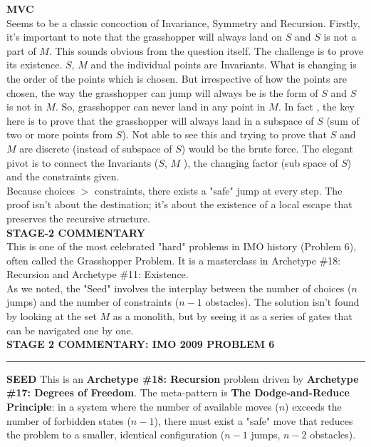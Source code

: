 \documentclass{article}
\begin{document}
\noindent \textbf{MVC} \\
Seems to be a classic concoction of Invariance, Symmetry and Recursion. Firstly, it's important to note that the grasshopper will always land on $S$ and $S$ is not a part of $M$. This sounds obvious from the question itself. The challenge is to prove its existence. $S$, $M$ and the individual points are Invariants. What is changing is the order of the points which is chosen. But irrespective of how the points are chosen, the way the grasshopper can jump will always be is the form of $S$ and $S$ is not in $M$. So, grasshopper can never land in any point in $M$. In fact , the key here is to prove that the grasshopper will always land in a subspace of $S$ (sum of two or more points from $S$). Not able to see this and trying to prove that $S$ and $M$ are discrete (instead of subspace of $S$) would be the brute force. The elegant pivot is to connect the Invariants ($S$, $M$ ), the changing factor (sub space of $S$) and the constraints given. \\

\noindent Because choices $>$ constraints, there exists a "safe" jump at every step. The proof isn't about the destination; it's about the existence of a local escape that preserves the recursive structure. \\

\noindent \textbf{STAGE-2 COMMENTARY} \\
This is one of the most celebrated "hard" problems in IMO history (Problem 6), often called the Grasshopper Problem. It is a masterclass in Archetype \#18: Recursion and Archetype \#11: Existence. \\

\noindent As we noted, the "Seed" involves the interplay between the number of choices ($n$ jumps) and the number of constraints ($n-1$ obstacles). The solution isn't found by looking at the set $M$ as a monolith, but by seeing it as a series of gates that can be navigated one by one. \\

\noindent \textbf{STAGE 2 COMMENTARY: IMO 2009 PROBLEM 6} \\

\noindent \rule{\textwidth}{0.4pt}

\noindent \textbf{SEED}
This is an \textbf{Archetype \#18: Recursion} problem driven by \textbf{Archetype \#17: Degrees of Freedom}. The meta-pattern is \textbf{The Dodge-and-Reduce Principle}: in a system where the number of available moves ($n$) exceeds the number of forbidden states ($n-1$), there must exist a "safe" move that reduces the problem to a smaller, identical configuration ($n-1$ jumps, $n-2$ obstacles).\\
\end{document}
